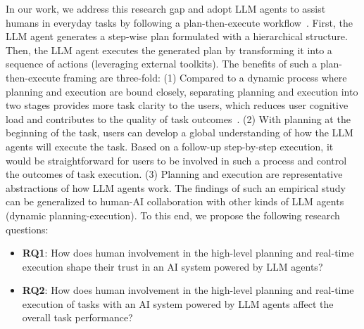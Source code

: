 In our work, we address this research gap and adopt LLM agents to assist humans in everyday tasks by following a %
plan-then-execute workflow~\cite{wang2023plan}. 
First, the LLM agent generates a step-wise plan formulated with a hierarchical structure. 
Then, the LLM agent executes the generated plan by transforming it into a sequence of actions (leveraging external toolkits). 
The benefits of such a plan-then-execute framing are three-fold: 
(1) Compared to a dynamic process where planning and execution are bound closely, separating planning and execution into two stages provides more task clarity to the users, which reduces user cognitive load and contributes to the quality of task outcomes~\cite{gadiraju2017clarity}. 
(2) With planning at the beginning of the task, users can develop a global understanding of how the LLM agents will execute the task. 
Based on a follow-up step-by-step execution, it would be straightforward for users to be involved in such a process and control the outcomes of task execution. %
(3) Planning and execution are representative abstractions of how LLM agents work. 
The findings of such an empirical study can be generalized to human-AI collaboration with other kinds of LLM agents (\eg dynamic planning-execution). %
%
To this end, we propose the following research questions:
\begin{itemize}
\item \textbf{RQ1}: How does human involvement in the high-level planning and real-time execution shape their trust in an AI system powered by LLM agents?
\item \textbf{RQ2}: How does human involvement in the high-level planning and real-time execution of tasks with an AI system powered by LLM agents affect the overall task performance?
\end{itemize}


